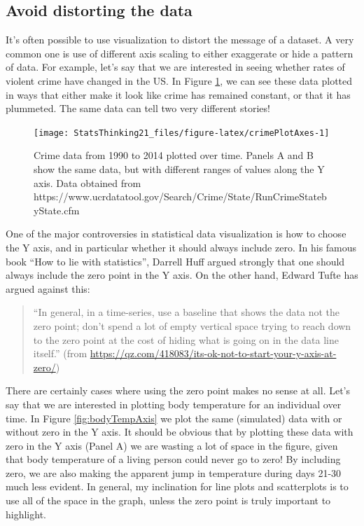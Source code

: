 \documentclass[12pt,]{book}
\theoremstyle{definition}
\theoremstyle{definition}
\theoremstyle{definition}
\theoremstyle{remark}
\begin{document}
\hypertarget{avoid-distorting-the-data}{%
\subsection{Avoid distorting the data}\label{avoid-distorting-the-data}}

It's often possible to use visualization to distort the message of a dataset. A very common one is use of different axis scaling to either exaggerate or hide a pattern of data. For example, let's say that we are interested in seeing whether rates of violent crime have changed in the US. In Figure \ref{fig:crimePlotAxes}, we can see these data plotted in ways that either make it look like crime has remained constant, or that it has plummeted. The same data can tell two very different stories!

\begin{figure}
\texttt{[image: StatsThinking21\_files/figure-latex/crimePlotAxes-1]} \caption{Crime data from 1990 to 2014 plotted over time.  Panels A and B show the same data, but with different ranges of values along the Y axis. Data obtained from https://www.ucrdatatool.gov/Search/Crime/State/RunCrimeStatebyState.cfm}\label{fig:crimePlotAxes}
\end{figure}

One of the major controversies in statistical data visualization is how to choose the Y axis, and in particular whether it should always include zero. In his famous book ``How to lie with statistics'', Darrell Huff argued strongly that one should always include the zero point in the Y axis. On the other hand, Edward Tufte has argued against this:

\begin{quote}
``In general, in a time-series, use a baseline that shows the data not the zero point; don't spend a lot of empty vertical space trying to reach down to the zero point at the cost of hiding what is going on in the data line itself.'' (from \url{https://qz.com/418083/its-ok-not-to-start-your-y-axis-at-zero/})
\end{quote}

There are certainly cases where using the zero point makes no sense at all. Let's say that we are interested in plotting body temperature for an individual over time. In Figure \ref{fig:bodyTempAxis} we plot the same (simulated) data with or without zero in the Y axis. It should be obvious that by plotting these data with zero in the Y axis (Panel A) we are wasting a lot of space in the figure, given that body temperature of a living person could never go to zero! By including zero, we are also making the apparent jump in temperature during days 21-30 much less evident. In general, my inclination for line plots and scatterplots is to use all of the space in the graph, unless the zero point is truly important to highlight.
\end{document}
